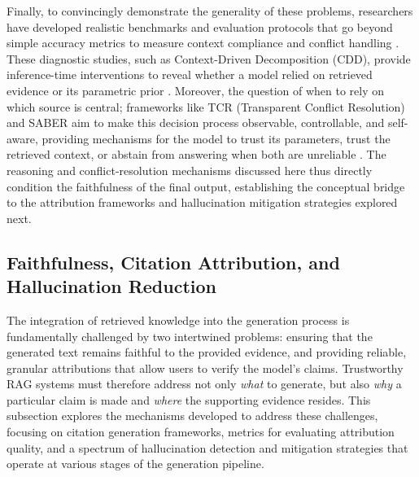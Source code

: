 \documentclass[11pt]{article}
\begin{document}
Finally, to convincingly demonstrate the generality of these problems, researchers have developed realistic benchmarks and evaluation protocols that go beyond simple accuracy metrics to measure context compliance and conflict handling \cite{ref189,ref171}. These diagnostic studies, such as Context-Driven Decomposition (CDD), provide inference-time interventions to reveal whether a model relied on retrieved evidence or its parametric prior \cite{ref171}. Moreover, the question of when to rely on which source is central; frameworks like TCR (Transparent Conflict Resolution) and SABER aim to make this decision process observable, controllable, and self-aware, providing mechanisms for the model to trust its parameters, trust the retrieved context, or abstain from answering when both are unreliable \cite{ref190,ref191}. The reasoning and conflict-resolution mechanisms discussed here thus directly condition the faithfulness of the final output, establishing the conceptual bridge to the attribution frameworks and hallucination mitigation strategies explored next.

\subsection{Faithfulness, Citation Attribution, and Hallucination Reduction}

The integration of retrieved knowledge into the generation process is fundamentally challenged by two intertwined problems: ensuring that the generated text remains faithful to the provided evidence, and providing reliable, granular attributions that allow users to verify the model's claims. Trustworthy RAG systems must therefore address not only \emph{what} to generate, but also \emph{why} a particular claim is made and \emph{where} the supporting evidence resides. This subsection explores the mechanisms developed to address these challenges, focusing on citation generation frameworks, metrics for evaluating attribution quality, and a spectrum of hallucination detection and mitigation strategies that operate at various stages of the generation pipeline.
\end{document}
